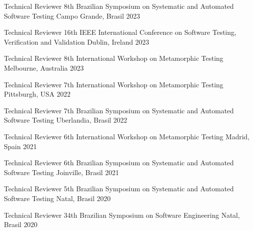\begin{cvhonors}

  \cvhonor
    {Technical Reviewer} %
    {8th Brazilian Symposium on Systematic and Automated Software Testing} %
    {Campo Grande, Brasil} %
    {2023} %

  \cvhonor
    {Technical Reviewer} %
    {16th IEEE International Conference on Software Testing, Verification and Validation} %
    {Dublin, Ireland} %
    {2023} %

  \cvhonor
    {Technical Reviewer} %
    {8th International Workshop on Metamorphic Testing} %
    {Melbourne, Australia} %
    {2023} %

  \cvhonor
    {Technical Reviewer} %
    {7th International Workshop on Metamorphic Testing} %
    {Pittsburgh, USA} %
    {2022} %

  \cvhonor
    {Technical Reviewer} %
    {7th Brazilian Symposium on Systematic and Automated Software Testing} %
    {Uberlandia, Brasil} %
    {2022} %

  \cvhonor
    {Technical Reviewer} %
    {6th International Workshop on Metamorphic Testing} %
    {Madrid, Spain} %
    {2021} %
    
    
  \cvhonor
    {Technical Reviewer} %
    {6th Brazilian Symposium on Systematic and Automated Software Testing} %
    {Joinville, Brasil} %
    {2021} %
    
    
  \cvhonor
    {Technical Reviewer} %
    {5th Brazilian Symposium on Systematic and Automated Software Testing} %
    {Natal, Brasil} %
    {2020} %
    
  \cvhonor
    {Technical Reviewer} %
    {34th Brazilian Symposium on Software Engineering} %
    {Natal, Brasil} %
    {2020} %
    


\end{cvhonors}

